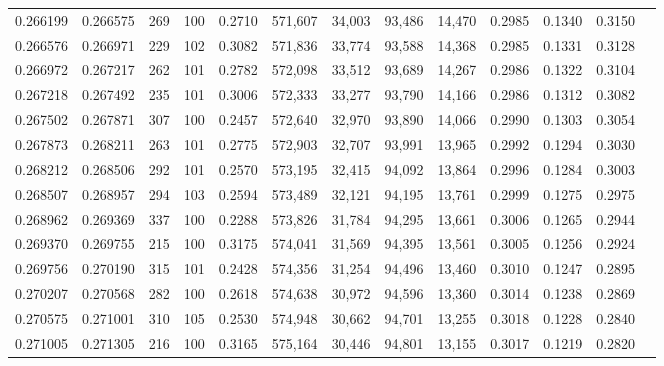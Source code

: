 \begin{tabular}{rrrrrrrrrrrrr}
0.266199 & 0.266575 &   269 & 100 &                                     0.2710 & 571,607 &  34,003 &  93,486 &  14,470 & 0.2985 & 0.1340 & 0.3150 \\
0.266576 & 0.266971 &   229 & 102 &                                     0.3082 & 571,836 &  33,774 &  93,588 &  14,368 & 0.2985 & 0.1331 & 0.3128 \\
0.266972 & 0.267217 &   262 & 101 &                                     0.2782 & 572,098 &  33,512 &  93,689 &  14,267 & 0.2986 & 0.1322 & 0.3104 \\
0.267218 & 0.267492 &   235 & 101 &                                     0.3006 & 572,333 &  33,277 &  93,790 &  14,166 & 0.2986 & 0.1312 & 0.3082 \\
0.267502 & 0.267871 &   307 & 100 &                                     0.2457 & 572,640 &  32,970 &  93,890 &  14,066 & 0.2990 & 0.1303 & 0.3054 \\
0.267873 & 0.268211 &   263 & 101 &                                     0.2775 & 572,903 &  32,707 &  93,991 &  13,965 & 0.2992 & 0.1294 & 0.3030 \\
0.268212 & 0.268506 &   292 & 101 &                                     0.2570 & 573,195 &  32,415 &  94,092 &  13,864 & 0.2996 & 0.1284 & 0.3003 \\
0.268507 & 0.268957 &   294 & 103 &                                     0.2594 & 573,489 &  32,121 &  94,195 &  13,761 & 0.2999 & 0.1275 & 0.2975 \\
0.268962 & 0.269369 &   337 & 100 &                                     0.2288 & 573,826 &  31,784 &  94,295 &  13,661 & 0.3006 & 0.1265 & 0.2944 \\
0.269370 & 0.269755 &   215 & 100 &                                     0.3175 & 574,041 &  31,569 &  94,395 &  13,561 & 0.3005 & 0.1256 & 0.2924 \\
0.269756 & 0.270190 &   315 & 101 &                                     0.2428 & 574,356 &  31,254 &  94,496 &  13,460 & 0.3010 & 0.1247 & 0.2895 \\
0.270207 & 0.270568 &   282 & 100 &                                     0.2618 & 574,638 &  30,972 &  94,596 &  13,360 & 0.3014 & 0.1238 & 0.2869 \\
0.270575 & 0.271001 &   310 & 105 &                                     0.2530 & 574,948 &  30,662 &  94,701 &  13,255 & 0.3018 & 0.1228 & 0.2840 \\
0.271005 & 0.271305 &   216 & 100 &                                     0.3165 & 575,164 &  30,446 &  94,801 &  13,155 & 0.3017 & 0.1219 & 0.2820 \\

\end{tabular}
